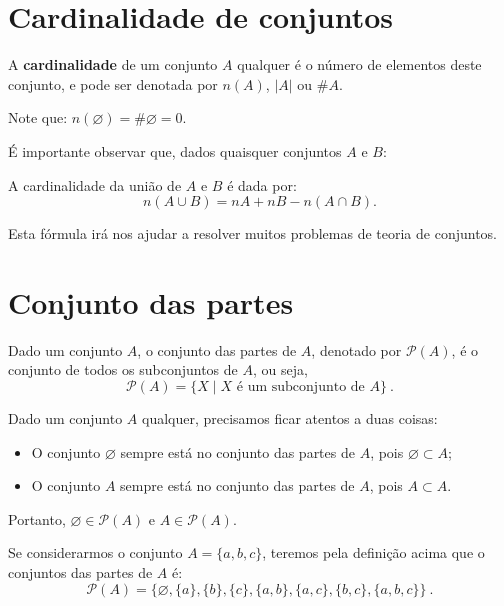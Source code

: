 \section{Cardinalidade de conjuntos}

 A \textbf{cardinalidade} de um conjunto $A$ qualquer é o número de elementos deste conjunto, e pode ser denotada por $n(A)$, $|A|$ ou $\# A$.

 Note que: $n(\varnothing)= \# \varnothing= 0$.

 É importante observar que, dados quaisquer conjuntos $A$ e $B$:
 
 A cardinalidade da união de $A$ e $B$ é dada por:
\begin{equation*}
n(A \cup B)= n A + n B - n(A \cap B) .
\end{equation*}

 Esta fórmula irá nos ajudar a resolver muitos problemas de teoria de conjuntos.

 \section{Conjunto das partes}

 Dado um conjunto $A$, o conjunto das partes de $A$, denotado por $\mathcal{P}(A)$, é o conjunto de todos os subconjuntos de $A$, ou seja,
\begin{equation*}
\mathcal{P}(A)= \{X \mid X \text{ é um subconjunto de } A\} \ .
\end{equation*}

 Dado um conjunto $A$ qualquer, precisamos ficar atentos a duas coisas:
 \begin{itemize}
 \item O conjunto $\varnothing$ sempre está no conjunto das partes de $A$, pois $\varnothing \subset A$;
 \item O conjunto $A$ sempre está no conjunto das partes de $A$, pois $A \subset A$.
 \end{itemize}
 Portanto, $\varnothing \in \mathcal{P}(A)$ e $A \in \mathcal{P}(A)$.

 \begin{exem}\label{ex:partes-abc}
 Se considerarmos o conjunto $A= \{a, b, c\}$, teremos pela definição acima que o conjuntos das partes de $A$ é:
\begin{equation*}
\mathcal{P}(A)= \{ \varnothing, \{a\}, \{b\}, \{c\}, \{a, b\}, \{a, c\}, \{b, c\}, \{a, b, c\} \} \ .
\end{equation*}
 \end{exem}

